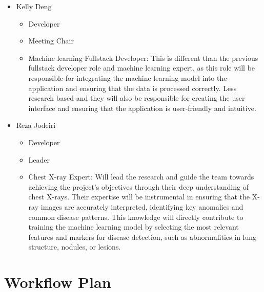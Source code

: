 \documentclass{article}
\begin{document}
\begin{itemize}
\item Kelly Deng
    \begin{itemize}
        \item Developer
        \item Meeting Chair
        \item Machine learning Fullstack Developer: This is different than the previous fullstack developer role and machine learning expert, as this role will be responsible for integrating the machine learning model into the application and ensuring that the data is processed correctly. Less research based and they will also be responsible for creating the user interface and ensuring that the application is user-friendly and intuitive.
    \end{itemize}
\item Reza Jodeiri
    \begin{itemize}
        \item Developer
        \item Leader 
        \item Chest X-ray Expert: Will lead the research and guide the team towards achieving the project’s objectives through their deep understanding of chest X-rays. Their expertise will be instrumental in ensuring that the X-ray images are accurately interpreted, identifying key anomalies and common disease patterns. This knowledge will directly contribute to training the machine learning model by selecting the most relevant features and markers for disease detection, such as abnormalities in lung structure, nodules, or lesions. 
    \end{itemize}
\end{itemize}
  
\section{Workflow Plan}
\end{document}
